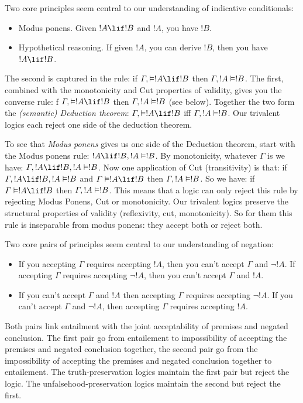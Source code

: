 \documentclass[../../../include/open-logic-section]{subfiles}
\begin{document}
\begin{explain}
Two core principles seem central to our understanding of indicative conditionals:
\begin{itemize}
  \item Modus ponens. Given $!A \lif !B$ and $!A$, you have $!B$.
  \item Hypothetical reasoning. If given $!A$, you can derive $!B$, then you have $!A \lif !B$.
\end{itemize}
The second is captured in the rule: if $\Gamma, \Entails !A \lif !B$ then $\Gamma, !A \Entails !B$. The first, combined with the monotonicity and Cut properties of validity, gives you the converse rule: f $\Gamma, \Entails !A \lif !B$ then $\Gamma, !A \Entails !B$ (see below). Together the two form the \emph{(semantic) Deduction theorem}: $\Gamma, \Entails !A \lif !B$ iff $\Gamma, !A \Entails !B$. Our trivalent logics each reject one side of the deduction theorem. 

To see that \emph{Modus ponens} gives us one side of the Deduction theorem, start with the Modus ponens rule: $!A\lif !B, !A \Entails !B $. By monotonicity, whatever $\Gamma$ is we have: $\Gamma, !A\lif !B, !A \Entails !B $. Now one application of Cut (transitivity) is that: if $\Gamma, !A \lif !B, !A \Entails !B $ and $\Gamma \Entails !A \lif !B$ then $\Gamma, !A \Entails !B$. So we have: if $\Gamma \Entails !A \lif !B$ then $\Gamma, !A \Entails !B$. This means that a logic can only reject this rule by rejecting Modus Ponens, Cut or monotonicity. Our trivalent logics preserve the structural properties of validity (reflexivity, cut, monotonicity). So for them this rule is inseparable from modus ponens: they accept both or reject both.
\end{explain}

\begin{explain}
Two core pairs of principles seem central to our understanding of negation:
\begin{itemize}
  \item If you accepting $\Gamma$ requires accepting $!A$, then you can't accept $\Gamma$ and $\lnot !A$. If accepting $\Gamma$ requires accepting $\lnot !A$, then you can't accept $\Gamma$ and $!A$.
  \item If you can't accept $\Gamma$ and $!A$ then accepting $\Gamma$ requires accepting $\lnot !A$. If you can't accept $\Gamma$ and $\lnot !A$, then accepting $\Gamma$ requires accepting $!A$.
\end{itemize}
Both pairs link entailment with the joint acceptability of premises and negated conclusion. The first pair go from entailement to impossibility of accepting the premises and negated conclusion together, the second pair go from the impossibility of accepting the premises and negated conclusion together to entailement. The truth-preservation logics maintain the first pair but reject the logic. The unfalsehood-preservation logics maintain the second but reject the first.
\end{explain}
\end{document}
